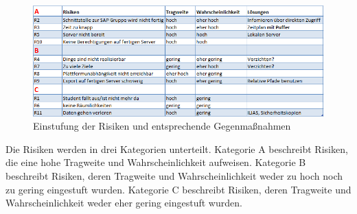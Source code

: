 \begin{figure}[H] 
  \centering
     \includegraphics[width=15cm]{Bilder/Risikoanalyse1.png}
  \caption{Einstufung der Risiken und entsprechende Gegenmaßnahmen}
  \label{fig:Abbildung 2}
\end{figure}

Die Risiken werden in drei Kategorien unterteilt. Kategorie A beschreibt Risiken, die eine hohe Tragweite und Wahrscheinlichkeit aufweisen. Kategorie B beschreibt Risiken, deren Tragweite und Wahrscheinlichkeit weder zu hoch noch zu gering eingestuft wurden. Kategorie C beschreibt Risiken, deren Tragweite und Wahrscheinlichkeit weder eher gering eingestuft wurden.

